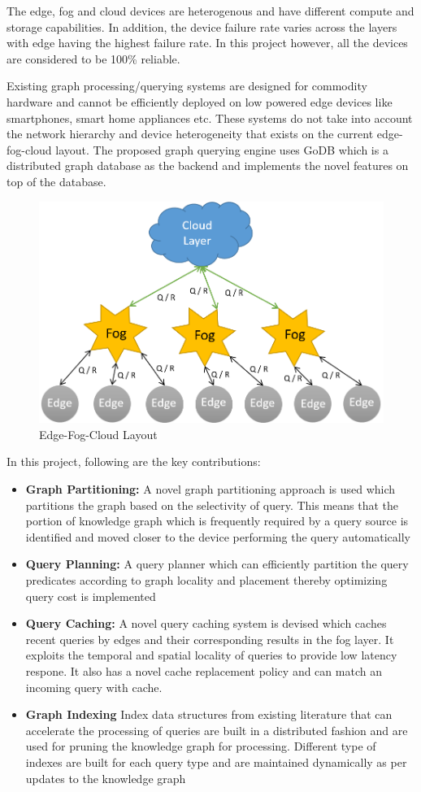 \documentclass[conference]{IEEEtran}
\begin{document}
The edge, fog and cloud devices are heterogenous and have different compute and storage capabilities. In addition, the device failure rate varies across the layers with edge having the highest failure rate. In this project however, all the devices are considered to be 100\% reliable.

Existing graph processing/querying systems are designed for commodity hardware and cannot be efficiently deployed on low powered edge devices like smartphones, smart home appliances etc. These systems do not take into account the network hierarchy and device heterogeneity that exists on the current edge-fog-cloud layout. The proposed graph querying engine uses GoDB which is a distributed graph database as the backend and implements the novel features on top of the database.

\begin{figure}[!t]
	\centering
	\includegraphics[width=0.75\columnwidth]{1.png}
	\caption{Edge-Fog-Cloud Layout}
	\label{fig:1}
\end{figure}
In this project, following are the key contributions:
\begin{itemize}%
	\item \textbf{Graph Partitioning:} A novel graph partitioning approach is used which partitions the graph based on the selectivity of query. This means that the portion of knowledge graph which is frequently required by a query source is identified and moved closer to the device performing the query automatically 
	\item \textbf{Query Planning:} A query planner which can efficiently partition the query predicates according to graph locality and placement thereby optimizing query cost is implemented
	\item \textbf{Query Caching:} A novel query caching system is devised which caches recent queries by edges and their corresponding results in the fog layer. It exploits the temporal and spatial locality of queries to provide low latency respone. It also has a novel cache replacement policy and can match an incoming query with cache. 
	\item \textbf{Graph Indexing} Index data structures from existing literature that can accelerate the processing of queries are built in a distributed fashion and are used for pruning the knowledge graph for processing. Different type of indexes are built for each query type and are maintained dynamically as per updates to the knowledge graph    
\end{itemize}
\end{document}
